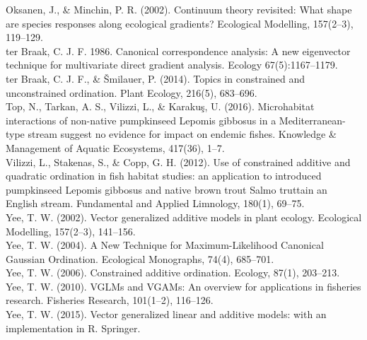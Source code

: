 \documentclass{article}
\begin{document}
Oksanen, J., \& Minchin, P. R. (2002). Continuum theory revisited: What shape are species responses along ecological gradients? Ecological Modelling, 157(2–3), 119–129.\\

ter Braak, C. J. F. 1986. Canonical correspondence analysis: A new eigenvector technique for multivariate direct gradient analysis. Ecology 67(5):1167–1179.\\ 

ter Braak, C. J. F., \& Šmilauer, P. (2014). Topics in constrained and unconstrained ordination. Plant Ecology, 216(5), 683–696.\\ 

Top, N., Tarkan, A. S., Vilizzi, L., \& Karakuş, U. (2016). Microhabitat interactions of non-native pumpkinseed Lepomis gibbosus in a Mediterranean-type stream suggest no evidence for impact on endemic fishes. Knowledge \& Management of Aquatic Ecosystems, 417(36), 1–7.\\


Vilizzi, L., Stakenas, S., \& Copp, G. H. (2012). Use of constrained additive and quadratic ordination in fish habitat studies: an application to introduced pumpkinseed Lepomis gibbosus and native brown trout Salmo truttain an English stream. Fundamental and Applied Limnology, 180(1), 69–75. \\

Yee, T. W. (2002). Vector generalized additive models in plant ecology. Ecological Modelling, 157(2–3), 141–156.\\

Yee, T. W. (2004). A New Technique for Maximum-Likelihood Canonical Gaussian Ordination. Ecological Monographs, 74(4), 685–701.\\

Yee, T. W. (2006). Constrained additive ordination. Ecology, 87(1), 203–213. \\

Yee, T. W. (2010). VGLMs and VGAMs: An overview for applications in fisheries research. Fisheries Research, 101(1–2), 116–126. \\

Yee, T. W. (2015). Vector generalized linear and additive models: with an implementation in R. Springer.\\
\end{document}
